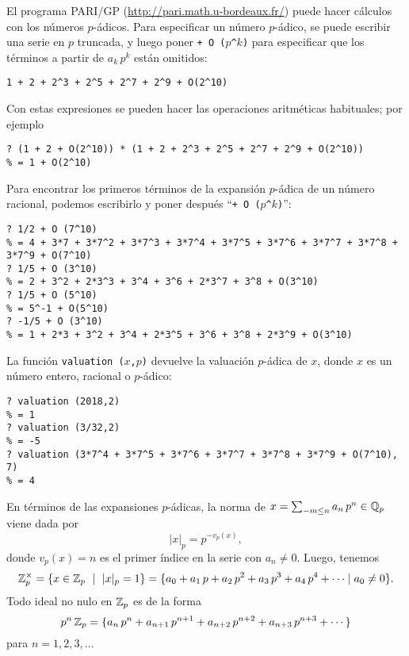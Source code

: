 \documentclass{article}
\numberwithin{equation}{section}
\theoremstyle{definition}
\begin{document}
\begin{framed}
  El programa PARI/GP (\url{http://pari.math.u-bordeaux.fr/}) puede hacer
  cálculos con los números $p$-ádicos. Para especificar un número $p$-ádico,
  se puede escribir una serie en $p$ truncada, y luego poner
  \texttt{+~O~($p$\textasciicircum$k$)} para especificar que los términos
  a partir de $a_k\,p^k$ están omitidos: {\small
\begin{verbatim}
1 + 2 + 2^3 + 2^5 + 2^7 + 2^9 + O(2^10)
\end{verbatim}}

  Con estas expresiones se pueden hacer las operaciones aritméticas habituales;
  por ejemplo

  {\small
\begin{verbatim}
? (1 + 2 + O(2^10)) * (1 + 2 + 2^3 + 2^5 + 2^7 + 2^9 + O(2^10))
% = 1 + O(2^10)
\end{verbatim}}

  Para encontrar los primeros términos de la expansión $p$-ádica de un número
  racional, podemos escribirlo y poner después
  ``\texttt{+~O~($p$\textasciicircum$k$)}'':

{\small
\begin{verbatim}
? 1/2 + O (7^10)
% = 4 + 3*7 + 3*7^2 + 3*7^3 + 3*7^4 + 3*7^5 + 3*7^6 + 3*7^7 + 3*7^8 + 3*7^9 + O(7^10)
? 1/5 + O (3^10)
% = 2 + 3^2 + 2*3^3 + 3^4 + 3^6 + 2*3^7 + 3^8 + O(3^10)
? 1/5 + O (5^10)
% = 5^-1 + O(5^10)
? -1/5 + O (3^10)
% = 1 + 2*3 + 3^2 + 3^4 + 2*3^5 + 3^6 + 3^8 + 2*3^9 + O(3^10)
\end{verbatim}}

  La función \texttt{valuation ($x$,$p$)} devuelve la valuación $p$-ádica
  de $x$, donde $x$ es un número entero, racional o $p$-ádico:

{\small
\begin{verbatim}
? valuation (2018,2)
% = 1
? valuation (3/32,2)
% = -5
? valuation (3*7^4 + 3*7^5 + 3*7^6 + 3*7^7 + 3*7^8 + 3*7^9 + O(7^10), 7)
% = 4
\end{verbatim}}
\end{framed}

En términos de las expansiones $p$-ádicas, la norma
de $x = \sum_{-m\le n} a_n\,p^n\in\mathbb{Q}_p$ viene dada por
$$|x|_p = p^{-v_p (x)},$$
donde $v_p (x) = n$ es el primer índice en la serie con $a_n \ne 0$.
Luego, tenemos
\[ \mathbb{Z}_p^\times =
   \{ x\in\mathbb{Z}_p ~\mid~ |x|_p = 1 \} =
   \{ a_0 + a_1\,p + a_2\,p^2 + a_3\,p^3 + a_4\,p^4 + \cdots \mid a_0 \ne 0 \}. \]
Todo ideal no nulo en $\mathbb{Z}_p$ es de la forma
\[ p^n\,\mathbb{Z}_p =
   \{ a_n\,p^n + a_{n+1}\,p^{n+1} + a_{n+2}\,p^{n+2} + a_{n+3}\,p^{n+3} + \cdots \} \]
para $n = 1,2,3,\ldots$
\end{document}
